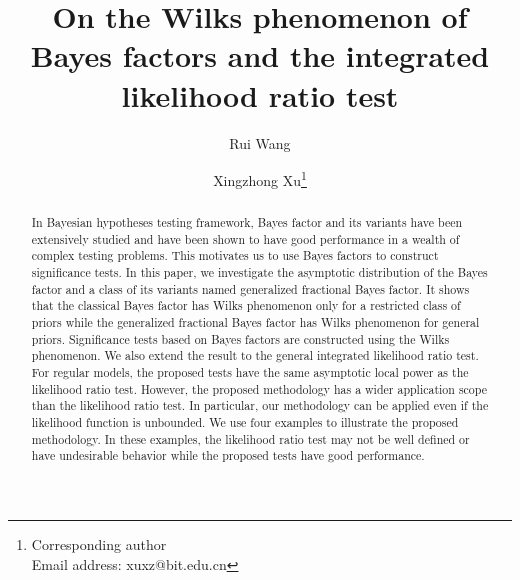 \documentclass[11pt]{article}
\theoremstyle{plain}
\theoremstyle{definition}
\theoremstyle{remark}
\begin{document}
\title{On the Wilks phenomenon of Bayes factors and the integrated likelihood ratio test}
\author[1]{Rui Wang}
\author[1,2]{Xingzhong Xu\thanks{Corresponding author\\Email address: xuxz@bit.edu.cn}}

\maketitle


\begin{abstract}
In Bayesian hypotheses testing framework, Bayes factor and its variants have been extensively studied and have been shown to have good performance in a wealth of complex testing problems.
This motivates us to use Bayes factors to construct significance tests.
In this paper, we investigate the asymptotic distribution of the Bayes factor and a class of its variants named generalized fractional Bayes factor.
It shows that the classical Bayes factor has Wilks phenomenon only for a restricted class of priors while the generalized fractional Bayes factor has Wilks phenomenon for general priors.
Significance tests based on Bayes factors are constructed using the Wilks phenomenon.
We also extend the result to the general integrated likelihood ratio test.
For regular models, the proposed tests have the same asymptotic local power as the likelihood ratio test.
However, %
the proposed methodology has a wider application scope than the likelihood ratio test.
In particular, our methodology can be applied even if the likelihood function is unbounded.
We use four examples to illustrate the proposed methodology.
In these examples, the likelihood ratio test may not be well defined or have undesirable behavior while the proposed tests have good performance.
\end{abstract}
\end{document}
